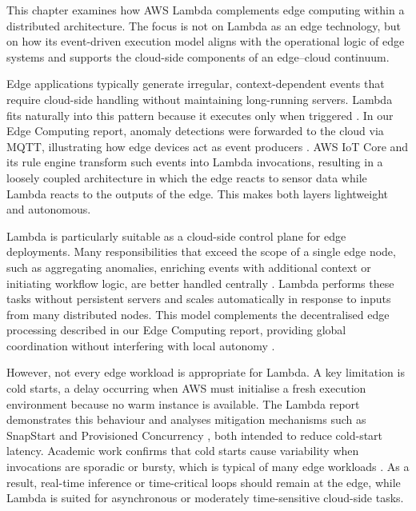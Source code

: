 This chapter examines how AWS Lambda complements edge computing within a distributed architecture. The focus is not on Lambda as an edge technology, but on how its event-driven execution model aligns with the operational logic of edge systems and supports the cloud-side components of an edge–cloud continuum.

Edge applications typically generate irregular, context-dependent events that require cloud-side handling without maintaining long-running servers. Lambda fits naturally into this pattern because it executes only when triggered \cite{aws_lambda_runtime, aws_serverless_whitepaper}. In our Edge Computing report, anomaly detections were forwarded to the cloud via MQTT, illustrating how edge devices act as event producers \cite{edge_computing_report}. AWS IoT Core and its rule engine transform such events into Lambda invocations, resulting in a loosely coupled architecture in which the edge reacts to sensor data while Lambda reacts to the outputs of the edge. This makes both layers lightweight and autonomous.

Lambda is particularly suitable as a cloud-side control plane for edge deployments. Many responsibilities that exceed the scope of a single edge node, such as aggregating anomalies, enriching events with additional context or initiating workflow logic, are better handled centrally \cite{aws_serverless_whitepaper}. Lambda performs these tasks without persistent servers and scales automatically in response to inputs from many distributed nodes. This model complements the decentralised edge processing described in our Edge Computing report, providing global coordination without interfering with local autonomy \cite{edge_computing_report}.

However, not every edge workload is appropriate for Lambda. A key limitation is cold starts, a delay occurring when AWS must initialise a fresh execution environment because no warm instance is available. The Lambda report \cite{lambda_report} demonstrates this behaviour and analyses mitigation mechanisms such as SnapStart \cite{aws_snapstart} and Provisioned Concurrency \cite{aws_provisioned_concurrency}, both intended to reduce cold-start latency. Academic work confirms that cold starts cause variability when invocations are sporadic or bursty, which is typical of many edge workloads \cite{wang_peeking_serverless}. As a result, real-time inference or time-critical loops should remain at the edge, while Lambda is suited for asynchronous or moderately time-sensitive cloud-side tasks.

